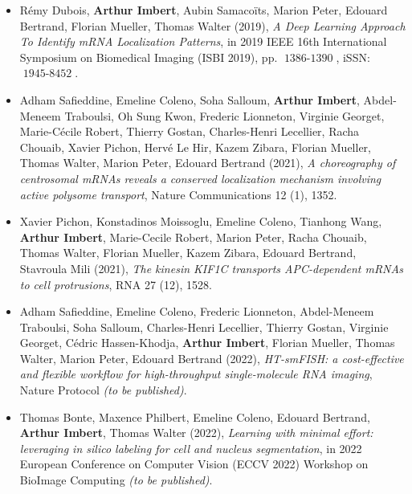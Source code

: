 \begin{itemize}
	\item Rémy Dubois, \textbf{Arthur Imbert}, Aubin Samacoïts, Marion Peter, Edouard Bertrand, Florian Mueller, Thomas Walter (2019), \textit{A Deep Learning Approach To Identify mRNA Localization Patterns}, in 2019 IEEE 16th International Symposium on Biomedical Imaging (ISBI 2019), pp. $\operatorname{1386-1390}$, iSSN: $\operatorname{1945-8452}$.
	\item Adham Safieddine, Emeline Coleno, Soha Salloum\footnotemark[1], \textbf{Arthur Imbert\footnotemark[1]}, Abdel-Meneem Traboulsi, Oh Sung Kwon, Frederic Lionneton, Virginie Georget, Marie-Cécile Robert, Thierry Gostan, Charles-Henri Lecellier, Racha Chouaib, Xavier Pichon, Hervé Le Hir, Kazem Zibara, Florian Mueller, Thomas Walter, Marion Peter, Edouard Bertrand (2021), \textit{A choreography of centrosomal mRNAs reveals a conserved localization mechanism involving active polysome transport}, Nature Communications 12 (1), 1352.
	\item Xavier Pichon\footnotemark[1], Konstadinos Moissoglu\footnotemark[1], Emeline Coleno, Tianhong Wang, \textbf{Arthur Imbert}, Marie-Cecile Robert, Marion Peter, Racha Chouaib, Thomas Walter, Florian Mueller, Kazem Zibara, Edouard Bertrand, Stavroula Mili (2021), \textit{The kinesin KIF1C transports APC-dependent mRNAs to cell protrusions}, RNA 27 (12), 1528.
	\item Adham Safieddine, Emeline Coleno, Frederic Lionneton, Abdel-Meneem Traboulsi, Soha Salloum, Charles-Henri Lecellier, Thierry Gostan, Virginie Georget, Cédric Hassen-Khodja, \textbf{Arthur Imbert}, Florian Mueller, Thomas Walter, Marion Peter, Edouard Bertrand (2022), \textit{HT-smFISH: a cost-effective and flexible workflow for high-throughput single-molecule RNA imaging}, Nature Protocol \textit{(to be published)}.
	\item Thomas Bonte, Maxence Philbert, Emeline Coleno, Edouard Bertrand, \textbf{Arthur Imbert}, Thomas Walter (2022), \textit{Learning with minimal effort: leveraging in silico labeling for cell and nucleus segmentation}, in 2022 European Conference on Computer Vision (ECCV 2022) Workshop on BioImage Computing \textit{(to be published)}.
\end{itemize}